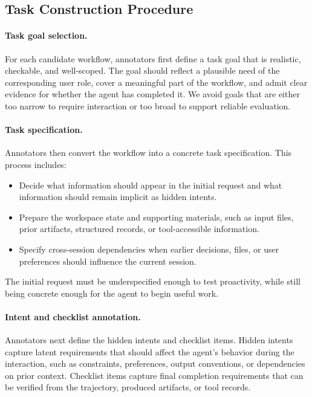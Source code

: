 \subsection{Task Construction Procedure}
\label{app:task_construction_procedure}

\paragraph{Task goal selection.}
For each candidate workflow, annotators first define a task goal that is realistic, checkable, and well-scoped. The goal should reflect a plausible need of the corresponding user role, cover a meaningful part of the workflow, and admit clear evidence for whether the agent has completed it. We avoid goals that are either too narrow to require interaction or too broad to support reliable evaluation.

\paragraph{Task specification.}
Annotators then convert the workflow into a concrete task specification. This process includes:
\begin{itemize}[leftmargin=10pt, topsep=0pt, itemsep=1pt, partopsep=1pt, parsep=1pt]
    \item Decide what information should appear in the initial request and what information should remain implicit as hidden intents.
    \item Prepare the workspace state and supporting materials, such as input files, prior artifacts, structured records, or tool-accessible information.
    \item Specify cross-session dependencies when earlier decisions, files, or user preferences should influence the current session.
\end{itemize}
The initial request must be underspecified enough to test proactivity, while still being concrete enough for the agent to begin useful work.

\paragraph{Intent and checklist annotation.}
Annotators next define the hidden intents and checklist items. Hidden intents capture latent requirements that should affect the agent's behavior during the interaction, such as constraints, preferences, output conventions, or dependencies on prior context. Checklist items capture final completion requirements that can be verified from the trajectory, produced artifacts, or tool records.

